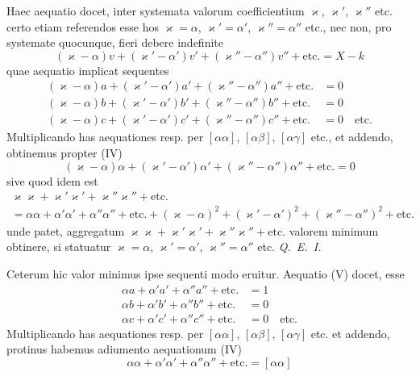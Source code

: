 \documentclass[12pt,a4paper]{book}
\begin{document}
Haec aequatio docet, inter systemata valorum coefficientium $\varkappa$, $\varkappa'$, $\varkappa''$ etc. certo etiam referendos esse hos $\varkappa=\alpha$, $\varkappa'=\alpha'$, $\varkappa''=\alpha''$ etc., nec non, pro systemate quocunque, fieri debere indefinite
%
\begin{equation*}
(\varkappa-\alpha)v+(\varkappa'-\alpha')v'+(\varkappa''-\alpha'')v''+\text{etc.}=X-k
\end{equation*}
quae aequatio implicat sequentes
%
\begin{align*}
(\varkappa-\alpha)a+(\varkappa'-\alpha')a'+(\varkappa''-\alpha'')a''+\text{etc.}&=0\\
(\varkappa-\alpha)b+(\varkappa'-\alpha')b'+(\varkappa''-\alpha'')b''+\text{etc.}&=0\\
(\varkappa-\alpha)c+(\varkappa'-\alpha')c'+(\varkappa''-\alpha'')c''+\text{etc.}&=0\quad\text{etc.}
\end{align*}
Multiplicando has aequationes resp. per $[\alpha\alpha]$, $[\alpha\beta]$, $[\alpha\gamma]$ etc., et addendo, obtinemus propter (IV)
%
\begin{equation*}
(\varkappa-\alpha)\alpha+(\varkappa'-\alpha')\alpha'+(\varkappa''-\alpha'')\alpha''+\text{etc.}=0
\end{equation*}
sive quod idem est
%
\begin{multline*}
\varkappa\varkappa+\varkappa'\varkappa'+\varkappa''\varkappa''+\text{etc.}\\
=\alpha\alpha+\alpha'\alpha'+\alpha''\alpha''+\text{etc.}+(\varkappa-\alpha)^2+(\varkappa'-\alpha')^2+(\varkappa''-\alpha'')^2+\text{etc.}
\end{multline*}
unde patet, aggregatum $\varkappa\varkappa+\varkappa'\varkappa'+\varkappa''\varkappa''+\text{etc.}$ valorem minimum obtinere, si statuatur $\varkappa=\alpha$, $\varkappa'=\alpha'$, $\varkappa''=\alpha''$ etc. \textit{Q.~E.~I.}

Ceterum hic valor minimus ipse sequenti modo eruitur. Aequatio (V) docet, esse
%
\begin{align*}
\alpha a+\alpha'a'+\alpha''a''+\text{etc.}&=1\\
\alpha b+\alpha'b'+\alpha''b''+\text{etc.}&=0\\
\alpha c+\alpha'c'+\alpha''c''+\text{etc.}&=0\quad\text{etc.}
\end{align*}
Multiplicando has aequationes resp. per $[\alpha\alpha]$, $[\alpha\beta]$, $[\alpha\gamma]$ etc. et addendo, protinus habemus adiumento aequationum (IV)
%
\begin{equation*}
\alpha\alpha+\alpha'\alpha'+\alpha''\alpha''+\text{etc.}=[\alpha\alpha]
\end{equation*}
\end{document}
